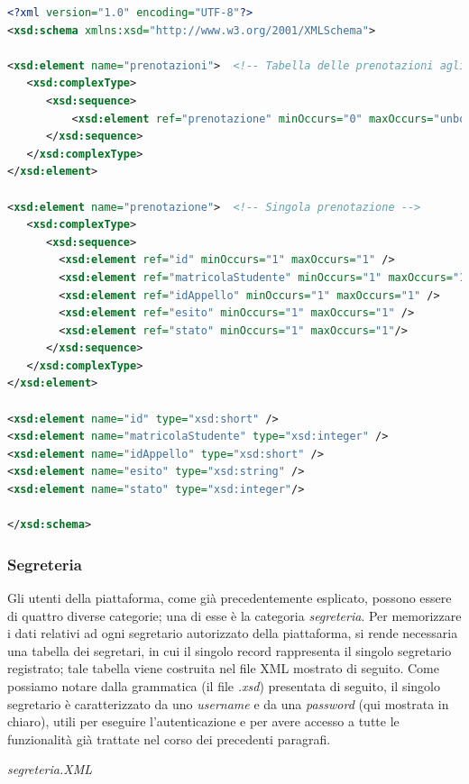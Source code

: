 \documentclass [a4paper,11pt]{book}
\begin{document}
\begin{lstlisting}[language=XML]
<?xml version="1.0" encoding="UTF-8"?>
<xsd:schema xmlns:xsd="http://www.w3.org/2001/XMLSchema">

<xsd:element name="prenotazioni">  <!-- Tabella delle prenotazioni agli appelli -->
   <xsd:complexType> 
      <xsd:sequence>
	      <xsd:element ref="prenotazione" minOccurs="0" maxOccurs="unbounded" />
      </xsd:sequence>
   </xsd:complexType>
</xsd:element>

<xsd:element name="prenotazione">  <!-- Singola prenotazione -->
   <xsd:complexType> 
      <xsd:sequence>
        <xsd:element ref="id" minOccurs="1" maxOccurs="1" /> 
        <xsd:element ref="matricolaStudente" minOccurs="1" maxOccurs="1" />
        <xsd:element ref="idAppello" minOccurs="1" maxOccurs="1" /> 
        <xsd:element ref="esito" minOccurs="1" maxOccurs="1" /> 
        <xsd:element ref="stato" minOccurs="1" maxOccurs="1"/>
      </xsd:sequence>
   </xsd:complexType>
</xsd:element>

<xsd:element name="id" type="xsd:short" />
<xsd:element name="matricolaStudente" type="xsd:integer" />
<xsd:element name="idAppello" type="xsd:short" />
<xsd:element name="esito" type="xsd:string" />
<xsd:element name="stato" type="xsd:integer"/>

</xsd:schema>
\end{lstlisting}

\medskip

\subsubsection{Segreteria}

Gli utenti della piattaforma, come già precedentemente esplicato, possono essere di quattro diverse categorie; una di esse è la categoria \emph{segreteria}. Per memorizzare i dati relativi ad ogni segretario autorizzato della piattaforma, si rende necessaria una tabella dei segretari, in cui il singolo record rappresenta il singolo segretario registrato; tale tabella viene costruita nel file XML mostrato di seguito. Come possiamo notare dalla grammatica (il file \emph{.xsd}) presentata di seguito, il singolo segretario è caratterizzato da uno \emph{username} e da una \emph{password} (qui mostrata in chiaro), utili per eseguire l'autenticazione e per avere accesso a tutte le funzionalità già trattate nel corso dei precedenti paragrafi.

\medskip

\emph{segreteria.XML}
\end{document}
